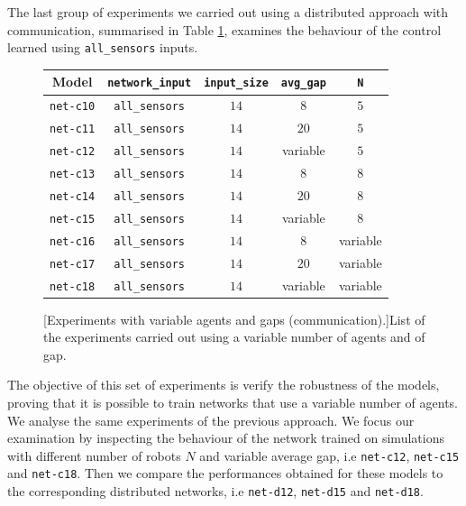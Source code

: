 The last group of experiments we carried out using a distributed approach with 
communication, summarised in Table \ref{tab:modelcomm}, examines the 
behaviour of the control learned using \texttt{all\_sensors} inputs. 
\begin{figure}[!htb]
	\centering
	\begin{tabular}{ccccc}
		\toprule
		\textbf{Model} \quad & \textbf{\texttt{network\_input}} & 
		\textbf{\texttt{input\_size}} & \textbf{\texttt{avg\_gap}} & \textbf{\texttt{N}}\\
		\midrule
		\texttt{net-c10} 	& \texttt{all\_sensors}		&  $14$  &  $8$		 	 &	 $5$ \\
		\texttt{net-c11} 	& \texttt{all\_sensors}		&  $14$  &  $20$		&	$5$ \\
		\texttt{net-c12} 	& \texttt{all\_sensors}		&  $14$  &  variable   &    $5$\\
		\texttt{net-c13} 	& \texttt{all\_sensors}	  	&  $14$  &  $8$			 &	  $8$ \\
		\texttt{net-c14} 	& \texttt{all\_sensors}	  	&  $14$  &  $20$   		&	 $8$ \\
		\texttt{net-c15} 	& \texttt{all\_sensors}	  	&  $14$  &  variable	&	 $8$ \\
		\texttt{net-c16} 	& \texttt{all\_sensors}	  	&  $14$  &  $ 8$		  &	 variable\\
		\texttt{net-c17} 	& \texttt{all\_sensors}	  	&  $14$  &  $20$		 &	variable\\
		\texttt{net-c18} 	& \texttt{all\_sensors}	  	&  $14$  &  variable	 &	
		variable\\
		\bottomrule
	\end{tabular}
	[Experiments with variable agents and gaps 
	(communication).]{List of the experiments carried out using a variable number 
		of agents and of gap.}
	\label{tab:modelcomm}
\end{figure}

The objective of this set of experiments is verify the robustness of the models, 
proving that it is possible to train networks that use a variable number of agents.
We analyse the same experiments of the previous approach.
We focus our examination by inspecting the behaviour of the network trained on 
simulations with different number of robots $N$ and variable average gap, i.e 
\texttt{net-c12}, \texttt{net-c15} and \texttt{net-c18}. Then we compare 
the 
performances obtained for these models to the corresponding distributed 
networks, i.e \texttt{net-d12}, \texttt{net-d15} and \texttt{net-d18}.

